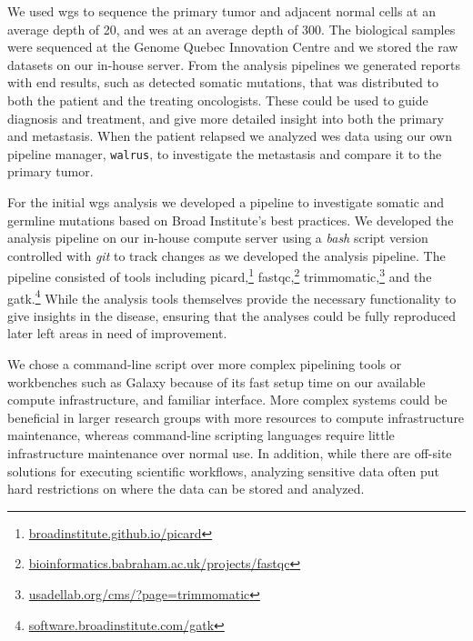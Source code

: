 We used \gls{wgs} to sequence the primary tumor and adjacent normal cells at an
average depth of 20, and \gls{wes} at an average depth of 300. The biological
samples were sequenced at the  Genome Quebec Innovation Centre and we stored the
raw datasets on our in-house server.  From the analysis pipelines we generated
reports with end results, such as detected somatic mutations, that was
distributed to both the patient and the treating oncologists. These could be
used to guide diagnosis and treatment, and give more detailed insight into both
the primary and metastasis.  When the patient relapsed we analyzed \gls{wes}
data using our own pipeline manager, \texttt{walrus}, to investigate the
metastasis and compare it to the primary tumor. 

For the initial \gls{wgs} analysis we developed a pipeline to investigate
somatic and germline mutations based on Broad Institute's best practices. We
developed the analysis pipeline on our in-house compute server using a
\emph{bash} script version controlled with \emph{git} to track changes as we
developed the analysis pipeline. The pipeline consisted of tools including
picard,\footnote{\url{broadinstitute.github.io/picard}}
fastqc,\footnote{\url{bioinformatics.babraham.ac.uk/projects/fastqc}}
trimmomatic,\footnote{\url{usadellab.org/cms/?page=trimmomatic}} and the
\gls{gatk}.\footnote{\url{software.broadinstitute.com/gatk}} While the analysis
tools themselves provide the necessary functionality to give insights in
the disease, ensuring that the analyses could be fully reproduced later left
areas in need of improvement.

We chose a command-line script over more complex pipelining tools or workbenches
such as Galaxy\cite{goecks2010galaxy} because of its fast setup time on our
available compute infrastructure, and familiar interface. More complex systems
could be beneficial in larger research groups with more resources to compute
infrastructure maintenance, whereas command-line scripting languages require
little infrastructure maintenance over normal use. In addition, while there are
off-site solutions for executing scientific workflows, analyzing sensitive data
often put hard restrictions on where the data can be stored and analyzed.


